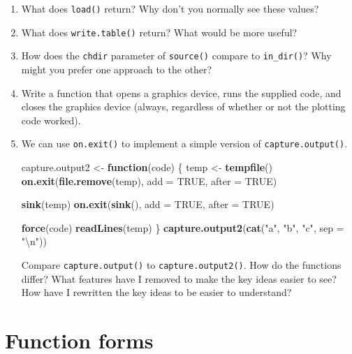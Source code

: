 \documentclass[]{book}
\newenvironment{Shaded}{\begin{snugshade}}{\end{snugshade}}
\newcommand{\KeywordTok}[1]{\textcolor[rgb]{0.13,0.29,0.53}{\textbf{#1}}}
\newcommand{\DataTypeTok}[1]{\textcolor[rgb]{0.13,0.29,0.53}{#1}}
\newcommand{\CharTok}[1]{\textcolor[rgb]{0.31,0.60,0.02}{#1}}
\newcommand{\StringTok}[1]{\textcolor[rgb]{0.31,0.60,0.02}{#1}}
\newcommand{\OtherTok}[1]{\textcolor[rgb]{0.56,0.35,0.01}{#1}}
\newcommand{\ControlFlowTok}[1]{\textcolor[rgb]{0.13,0.29,0.53}{\textbf{#1}}}
\newcommand{\NormalTok}[1]{#1}
\theoremstyle{definition}
\theoremstyle{definition}
\theoremstyle{definition}
\theoremstyle{remark}
\begin{document}
\begin{enumerate}
\def\labelenumi{\arabic{enumi}.}
\item
  What does \texttt{load()} return? Why don't you normally see these
  values?
\item
  What does \texttt{write.table()} return? What would be more useful?
\item
  How does the \texttt{chdir} parameter of \texttt{source()} compare to
  \texttt{in\_dir()}? Why might you prefer one approach to the other?
\item
  Write a function that opens a graphics device, runs the supplied code,
  and closes the graphics device (always, regardless of whether or not
  the plotting code worked).
\item
  We can use \texttt{on.exit()} to implement a simple version of
  \texttt{capture.output()}.

\begin{Shaded}
\begin{Highlighting}[]
\NormalTok{capture.output2 <-}\StringTok{ }\ControlFlowTok{function}\NormalTok{(code) \{}
\NormalTok{  temp <-}\StringTok{ }\KeywordTok{tempfile}\NormalTok{()}
  \KeywordTok{on.exit}\NormalTok{(}\KeywordTok{file.remove}\NormalTok{(temp), }\DataTypeTok{add =} \OtherTok{TRUE}\NormalTok{, }\DataTypeTok{after =} \OtherTok{TRUE}\NormalTok{)}

  \KeywordTok{sink}\NormalTok{(temp)}
  \KeywordTok{on.exit}\NormalTok{(}\KeywordTok{sink}\NormalTok{(), }\DataTypeTok{add =} \OtherTok{TRUE}\NormalTok{, }\DataTypeTok{after =} \OtherTok{TRUE}\NormalTok{)}

  \KeywordTok{force}\NormalTok{(code)}
  \KeywordTok{readLines}\NormalTok{(temp)}
\NormalTok{\}}
\KeywordTok{capture.output2}\NormalTok{(}\KeywordTok{cat}\NormalTok{(}\StringTok{"a"}\NormalTok{, }\StringTok{"b"}\NormalTok{, }\StringTok{"c"}\NormalTok{, }\DataTypeTok{sep =} \StringTok{"}\CharTok{\textbackslash{}n}\StringTok{"}\NormalTok{))}
\end{Highlighting}
\end{Shaded}

  Compare \texttt{capture.output()} to \texttt{capture.output2()}. How
  do the functions differ? What features have I removed to make the key
  ideas easier to see? How have I rewritten the key ideas to be easier
  to understand?
\end{enumerate}

\section{Function forms}\label{function-forms}
\end{document}
